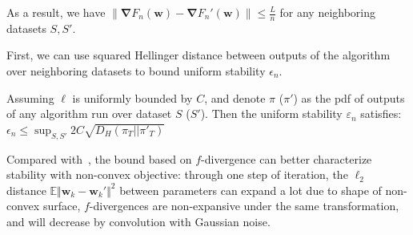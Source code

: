 \documentclass[final,12pt]{colt2018} %
\begin{document}
As a result, we have $\|\bm{\nabla}F_n(\bm{w})-\bm{\nabla}F_n'(\bm{w})\|\le \frac{L}{n}$ for any neighboring datasets $S,S'$.


First, we can use squared Hellinger distance between outputs of the algorithm over neighboring datasets to bound uniform stability $\epsilon_n$.
\begin{lemma}
\label{stability bound by Hellinger}
  Assuming $\ell$ is uniformly bounded by $C$, and denote $\pi$ ($\pi'$) as the pdf of outputs of any algorithm run over dataset $S$ ($S'$). Then the uniform stability $\varepsilon_n$ satisfies: $\epsilon_n \leqslant \sup_{S,S'} 2C\sqrt{D_{H}(\pi_T||\pi'_T)}$
\end{lemma}
Compared with~\cite{hardt2015train}, the bound based on $f$-divergence can better characterize stability with non-convex objective: through one step of iteration, the $\ell_2$ distance $\mathbb{E}\Vert \bm{w}_k-\bm{w}_k'\Vert^2$ between parameters can expand a lot due to shape of non-convex surface, $f$-divergences are non-expansive under the same transformation, and will decrease by convolution with Gaussian noise.
\end{document}
